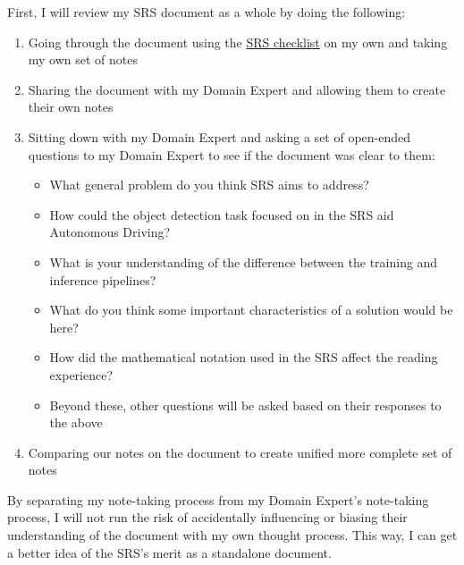 \documentclass[12pt, titlepage]{article}
\begin{document}
First, I will review my SRS document as a whole by doing the following:
\begin{enumerate}
  \item Going through the document using the \href{https://github.com/alaapgrandhi/equivariant-sensor-fusion/blob/main/docs/Checklists/SRS-Checklist.pdf}{SRS checklist} on my own and taking my own set of notes
  \item Sharing the document with my Domain Expert and allowing them to create their own notes
  \item Sitting down with my Domain Expert and asking a set of open-ended questions to my Domain Expert to see if the document was clear to them:
  \begin{itemize}
    \item What general problem do you think SRS aims to address?
    \item How could the object detection task focused on in the SRS aid Autonomous Driving?
    \item What is your understanding of the difference between the training and inference pipelines?
    \item What do you think some important characteristics of a solution would be here?
    \item How did the mathematical notation used in the SRS affect the reading experience?
    \item Beyond these, other questions will be asked based on their responses to the above
  \end{itemize}
  \item Comparing our notes on the document to create unified more complete set of notes
\end{enumerate}
By separating my note-taking process from my Domain Expert's note-taking process, I will not 
run the risk of accidentally influencing or biasing their understanding of the document with my 
own thought process. This way, I can get a better idea of the SRS's merit as a standalone document.
\end{document}
